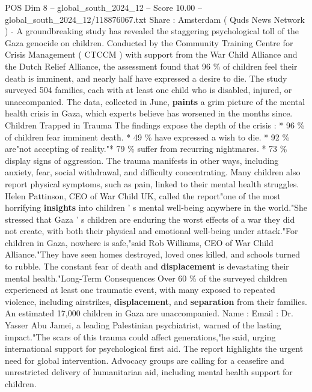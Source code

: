 \begin{textsample}{POS Dim 8 – global\_south\_2024\_12 – Score 10.00 – global\_south\_2024\_12/118876067.txt}  \label{ex:f8_pos_062}
Share : Amsterdam ( Quds News Network ) - A groundbreaking study has revealed the staggering psychological toll of the Gaza genocide on children.
Conducted by the Community Training Centre for Crisis Management ( CTCCM ) with support from the War Child Alliance and the Dutch Relief Alliance, the assessment found that 96 \% of children feel their death is imminent, and nearly half have expressed a desire to die.
The study surveyed 504 families, each with at least one child who is disabled, injured, or unaccompanied.
The data, collected in June, \textbf{paints} a grim picture of the mental health crisis in Gaza, which experts believe has worsened in the months since.
Children Trapped in Trauma The findings expose the depth of the crisis : * 96 \% of children fear imminent death. * 49 \% have expressed a wish to die. * 92 \% are"not accepting of reality."* 79 \% suffer from recurring nightmares. * 73 \% display signs of aggression.
The trauma manifests in other ways, including anxiety, fear, social withdrawal, and difficulty concentrating.
Many children also report physical symptoms, such as pain, linked to their mental health struggles.
Helen Pattinson, CEO of War Child UK, called the report"one of the most horrifying \textbf{insights} into children ' s mental well-being anywhere in the world."She stressed that Gaza ' s children are enduring the worst effects of a war they did not create, with both their physical and emotional well-being under attack."For children in Gaza, nowhere is safe,"said Rob Williams, CEO of War Child Alliance."They have seen homes destroyed, loved ones killed, and schools turned to rubble.
The constant fear of death and \textbf{displacement} is devastating their mental health."Long-Term Consequences Over 60 \% of the surveyed children experienced at least one traumatic event, with many exposed to repeated violence, including airstrikes, \textbf{displacement}, and \textbf{separation} from their families.
An estimated 17,000 children in Gaza are unaccompanied.
Name : Email : Dr.
Yasser Abu Jamei, a leading Palestinian psychiatrist, warned of the lasting impact."The scars of this trauma could affect generations,"he said, urging international support for psychological first aid.
The report highlights the urgent need for global intervention.
Advocacy groups are calling for a ceasefire and unrestricted delivery of humanitarian aid, including mental health support for children.

\end{textsample}

